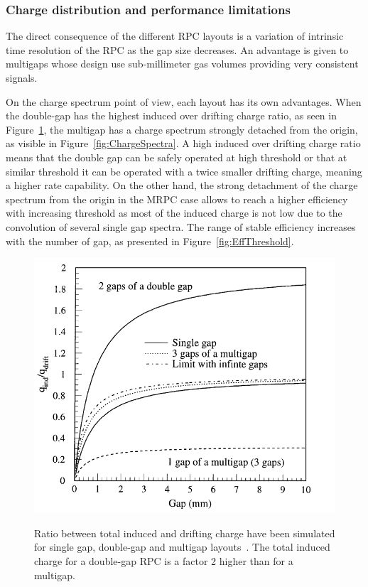 		\subsubsection{Charge distribution and performance limitations}
		\label{chapt4:sssec:charge}
		
	The direct consequence of the different RPC layouts is a variation of intrinsic time resolution of the RPC as the gap size decreases. An advantage is given to multigaps whose design use sub-millimeter gas volumes providing very consistent signals.
	
	On the charge spectrum point of view, each layout has its own advantages. When the double-gap has the highest induced over drifting charge ratio, as seen in Figure~\ref{fig:ChargeRatio}, the multigap has a charge spectrum strongly detached from the origin, as visible in Figure~\ref{fig:ChargeSpectra}. A high induced over drifting charge ratio means that the double gap can be safely operated at high threshold or that at similar threshold it can be operated with a twice smaller drifting charge, meaning a higher rate capability. On the other hand, the strong detachment of the charge spectrum from the origin in the MRPC case allows to reach a higher efficiency with increasing threshold as most of the induced charge is not low due to the convolution of several single gap spectra. The range of stable efficiency increases with the number of gap, as presented in Figure~\ref{fig:EffThreshold}.
	
	\begin{figure}[H]
		\centering
		\includegraphics[width = 0.6\plotwidth]{fig/chapt4/Layout_charge_ratio.png}\\
		\caption{\label{fig:ChargeRatio} Ratio between total induced and drifting charge have been simulated for single gap, double-gap and multigap layouts~\cite{ABBRESCIA99}. The total induced charge for a double-gap RPC is a factor 2 higher than for a multigap.}
	\end{figure}
	
